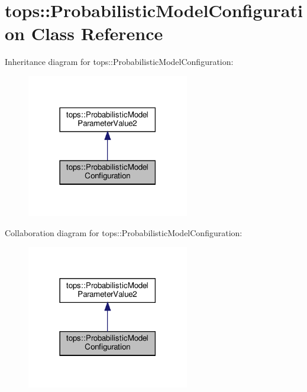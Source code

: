 \hypertarget{classtops_1_1ProbabilisticModelConfiguration}{}\section{tops\+:\+:Probabilistic\+Model\+Configuration Class Reference}
\label{classtops_1_1ProbabilisticModelConfiguration}


Inheritance diagram for tops\+:\+:Probabilistic\+Model\+Configuration\+:
\nopagebreak
\begin{figure}[H]
\begin{center}
\leavevmode
\includegraphics[width=201pt]{classtops_1_1ProbabilisticModelConfiguration__inherit__graph}
\end{center}
\end{figure}


Collaboration diagram for tops\+:\+:Probabilistic\+Model\+Configuration\+:
\nopagebreak
\begin{figure}[H]
\begin{center}
\leavevmode
\includegraphics[width=201pt]{classtops_1_1ProbabilisticModelConfiguration__coll__graph}
\end{center}
\end{figure}
